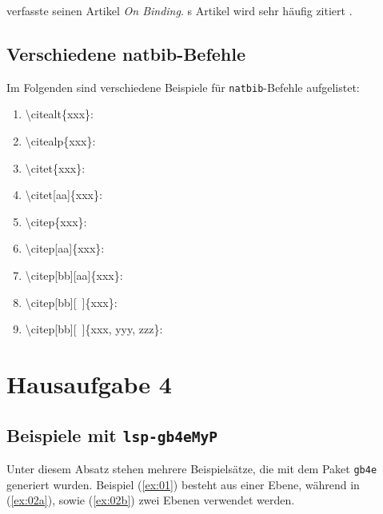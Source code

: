 \documentclass[10pt,paper=a4,abstracton]{scrartcl}
\begin{document}
\citeauthor{Chomsky80a} verfasste \citeyear{Chomsky80a} seinen Artikel \emph{On Binding}. \citeauthor{Chomsky80a}s Artikel wird sehr häufig zitiert \citep[vgl.][]{Heim&Kratzer00a}.


\subsection{Verschiedene natbib-Befehle}

Im Folgenden sind verschiedene Beispiele für \texttt{natbib}-Befehle aufgelistet:

\begin{enumerate}
	\item \textbackslash citealt\{xxx\}: \citealt{Heim&Kratzer00a}
	
	\item \textbackslash citealp\{xxx\}: \citealp{Heim01a}
	
	\item \textbackslash citet\{xxx\}: \citet{Winter97a}  
	
	\item \textbackslash citet[aa]\{xxx\}: \citet[36]{Champollion14a}
	
	\item \textbackslash citep\{xxx\}: \citep{Krifka89a}
	
	\item \textbackslash citep[aa]\{xxx\}: \citep[42]{MyP17c} 
	
	\item \textbackslash citep[bb][aa]\{xxx\}: \citep[vgl.][36]{Nolda&Co14a}
	
	\item \textbackslash citep[bb][~]\{xxx\}: \citep[vgl.][]{Heusinger&Co11a} 
	
	\item \textbackslash citep[bb][~]\{xxx, yyy, zzz\}: \citep[vgl.][]{Heim01a,Winter97a,Krifka89a}
\end{enumerate}


\section{Hausaufgabe 4}


\subsection{Beispiele mit \texttt{lsp-gb4eMyP}}

Unter diesem Absatz stehen mehrere Beispielsätze, die mit dem Paket \texttt{gb4e} generiert wurden. Beispiel (\ref{ex:01}) besteht aus einer Ebene, während in (\ref{ex:02a}), sowie (\ref{ex:02b}) zwei Ebenen verwendet werden. 
\end{document}
